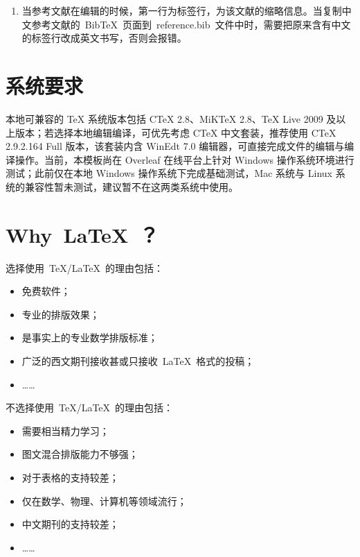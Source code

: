 \begin{enumerate}
\begin{enumerate}
    \item pdflatex + pdflatex. 在这种编译情况下，对应的~hnumain.tex~文件的第一行应该改为\verb|\def\usewhat{pdflatex}|~。 此时， 编译不支持~.eps~图片格式，此时需要在命令行下使用~epstopdf~指令将~figures~文件夹下 的~.eps~文件转化成~.pdf~ 文件格式，命令行中操作格式为~epstopdf a.eps~。
          在命令行编译的时候，依次输入~pdflatex hnumain~和~pdflatex hnumain， 编译完成之后，需要手动打开~pdf~文件。
    \item \textbf {推荐} 使用 Overleaf 在线平台编译：首先访问 Overleaf 官网，创建一个 blank project（空白项目），然后将相关文件（包括 hnumain.tex、reference.bib 以及 figures 文件夹等）上传至该项目中。在项目编辑界面的左侧 menu（菜单）中，找到编译方式设置选项，选择 xelatex 进行编译，即可完成文档生成并查看效果。这种方式无需本地配置 TeX 环境，操作简便且兼容性较好。
  \end{enumerate}
    \item  当参考文献在编辑的时候，第一行为标签行，为该文献的缩略信息。当复制中文参考文献的~BibTeX~页面到~reference.bib~文件中时，需要把原来含有中文的标签行改成英文书写，否则会报错。
\end{enumerate}

\section{系统要求}

    本地可兼容的 TeX 系统版本包括 CTeX 2.8、MiKTeX 2.8、TeX Live 2009 及以上版本；若选择本地编辑编译，可优先考虑 CTeX 中文套装，推荐使用 CTeX 2.9.2.164 Full 版本，该套装内含 WinEdt 7.0 编辑器，可直接完成文件的编辑与编译操作。当前，本模板尚在 Overleaf 在线平台上针对 Windows 操作系统环境进行测试；此前仅在本地 Windows 操作系统下完成基础测试，Mac 系统与 Linux 系统的兼容性暂未测试，建议暂不在这两类系统中使用。

\section{Why~\LaTeX~？}

选择使用~\TeX/\LaTeX~的理由包括：
\begin{itemize}
\item 免费软件；
\item 专业的排版效果；
\item 是事实上的专业数学排版标准；
\item 广泛的西文期刊接收甚或只接收~\LaTeX~格式的投稿；
\item[] ……
\end{itemize}
不选择使用~\TeX/\LaTeX~的理由包括：
\begin{itemize}
\item 需要相当精力学习；
\item 图文混合排版能力不够强；
\item 对于表格的支持较差；
\item 仅在数学、物理、计算机等领域流行；
\item 中文期刊的支持较差；
\item[] ……
\end{itemize}

